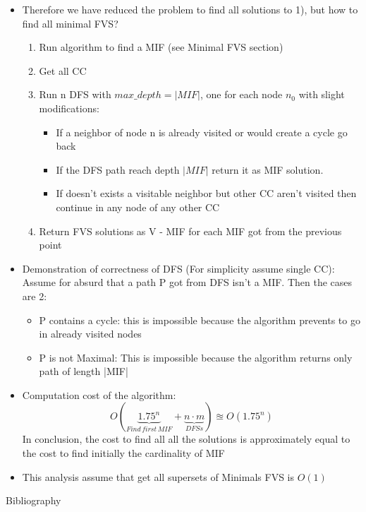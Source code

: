 \documentclass[11pt]{beamer}
\begin{document}
	\begin{frame}
		\begin{itemize}
			\item Therefore we have reduced the problem to find all solutions to 1), but how to find all minimal FVS?
			\begin{enumerate}
				\item Run algorithm to find a MIF (see Minimal FVS section)
				\item Get all CC
				\item Run n DFS with $ max\_depth=|MIF| $, one for each node $ n_0 $ with slight modifications:
				\begin{itemize}
					\item If a neighbor of node n is already visited or would create a cycle go back
					\item If the DFS path reach depth $ |MIF| $ return it as MIF solution.
					\item If doesn't exists a visitable neighbor but other CC aren't visited then continue in any node of any other CC
				\end{itemize}
				\item Return FVS solutions as V - MIF for each MIF got from the previous point
			\end{enumerate}
		\end{itemize}
	\end{frame}
	\begin{frame}
		\begin{itemize}
			\item Demonstration of correctness of DFS (For simplicity assume single CC): Assume for absurd that a path P got from DFS isn't a MIF. Then the cases are 2:
			\begin{itemize}
				\item P contains a cycle: this is impossible because the algorithm prevents to go in already visited nodes
				\item  P is not Maximal: This is impossible because the algorithm returns only path of length |MIF|
			\end{itemize}
			\item Computation cost of the algorithm: $$ O( \underbrace{1.75 ^ n}_{Find \, first \, MIF} + \underbrace{n \cdot m}_{DFSs}) \approxeq O(1.75^n) $$
			 In conclusion, the cost to find all all the solutions is approximately equal to the cost to find initially the cardinality of MIF
			 \item This analysis assume that get all supersets of Minimals FVS is $ O(1) $ 
		 	\end{itemize}
	\end{frame}
	\begin{frame}{Bibliography}
		\printbibliography
	\end{frame}
\end{document}

